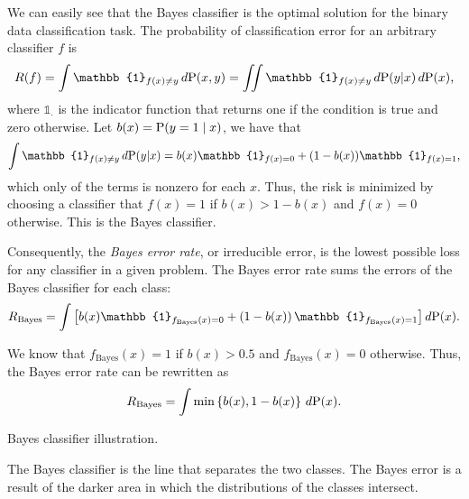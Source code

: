 We can easily see that the Bayes classifier is the optimal solution for the binary data
classification task.  The probability of classification error for an arbitrary classifier
$f$ is
\begin{equation*}
  R(f) = \int \mathbb{1}_{f(x) \neq y}\, d\!\Prob(x, y) =
    \iint \mathbb{1}_{f(x) \neq y}\, d\!\Prob(y | x)\, d\!\Prob(x)\text{,}
\end{equation*}
where $\mathbb{1}_{\cdot}$ is the indicator function that returns one if the condition is
true and zero otherwise.  Let $b(x) = \operatorname{P}(y = 1 \mid x)$, we have that
\[
  \int \mathbb{1}_{f(x) \neq y}\, d\!\Prob(y | x) =
    b(x) \mathbb{1}_{f(x) = 0} + (1 - b(x)) \mathbb{1}_{f(x) = 1}\text{,}
\]
which only of the terms is nonzero for each $x$.  Thus, the risk is minimized by choosing
a classifier that $f(x) = 1$ if $b(x) > 1 - b(x)$ and $f(x) = 0$ otherwise.  This is the
Bayes classifier.

Consequently, the \emph{Bayes error rate}, or irreducible error, is the lowest possible loss for any
classifier in a given problem.  The Bayes error rate sums the errors of the
Bayes classifier for each class:
\begin{equation*}
  R_\text{Bayes} = \int \left[
    b(x) \mathbb{1}_{f_\text{Bayes}(x) = 0} +
    \left(1 - b(x)\right) \mathbb{1}_{f_\text{Bayes}(x) = 1}
  \right] d\!\Prob(x)\text{.}
\end{equation*}

We know that $f_\text{Bayes}(x) = 1$ if $b(x) > 0.5$ and $f_\text{Bayes}(x) = 0$ otherwise.
Thus, the Bayes error rate can be rewritten as
\begin{equation*}
  R_\text{Bayes} = \int \min\left\{ b(x), 1 - b(x) \right\}\, d\!\operatorname{P}(x)\text{.}
\end{equation*}

\begin{figurebox}[label=fig:bayes-classifier]{Bayes classifier illustration.}
  \centering
  \tcblower
  The Bayes classifier is the line that separates the two classes.  The Bayes error is a
  result of the darker area in which the distributions of the classes intersect.
\end{figurebox}

